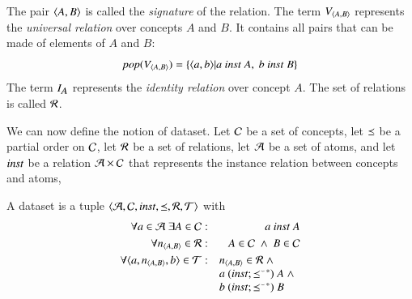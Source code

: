 \documentclass{elsarticle}
\begin{document}
	The pair $\langle{A},{B}\rangle$ is called the \emph{signature} of the relation.
	The term $V_{\langle{A},{B}\rangle}$ represents the \emph{universal relation} over concepts $A$ and $B$.
	It contains all pairs that can be made of elements of $A$ and $B$:
\[\text{\it pop\/}(V_{\langle{A},{B}\rangle}) = \{ \langle{a},{b}\rangle| a\ \text{\it inst\/}\ A,\ b\ \text{\it inst\/}\ B \}\]
	The term $I_{\text{\it \small A\/}}$ represents the \emph{identity relation} over concept $A$.
	The set of relations is called $\mathcal{R}$.
	
	We can now define the notion of dataset.
	Let	$\mathcal{C}$ be a set of concepts,
	let $\preceq$ be a partial order on $\mathcal{C}$,
	let $\mathcal{R}$ be a set of relations,
	let $\mathcal{A}$ be a set of atoms,
	and let $\text{\it inst\/}$ be a relation $\mathcal{A}\times\mathcal{C}$ that represents the instance relation between concepts and atoms,
\begin{definition}[dataset]
	\label{def:dataset}
	\item A dataset is a tuple $\langle\mathcal{A},\mathcal{C},\text{\it inst\/},\preceq,\mathcal{R},\mathcal{T}\rangle$ with
	\begin{eqnarray}
		\forall a\in\atoms\ \exists A\in\concepts&:&a\ \inst\ A\\
		\forall \declare{n}{A}{B}\in\rels&:&A\in\concepts\ \wedge\ B\in\concepts\\
		\forall\triple{a}{\declare{n}{A}{B}}{b}\in\triples&:&\begin{array}[t]{@{}l}\declare{n}{A}{B}\in\rels\ \wedge\\ a\ (\inst \compose \kleenestar{\flip{\isa}})\ A\ \wedge\\ b\ (\inst \compose \kleenestar{\flip{\isa}})\ B\end{array}
	\end{eqnarray}
\end{definition}
\end{document}
